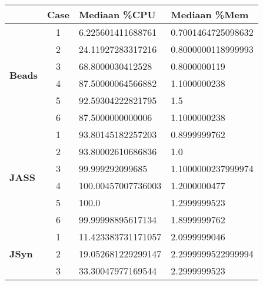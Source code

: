 \begin{table}[]
\centering
\begin{tabular}{l|c|l|l}
                                                    & \textbf{Case} & \textbf{Mediaan \%CPU} & \textbf{Mediaan \%Mem} \\ \hline
\multicolumn{1}{c}{\multirow{6}{*}{\textbf{Beads}}} & 1             & 6.225601411688761      & 0.7001464725098632     \\
\multicolumn{1}{c}{}                                & 2             & 24.11927283317216      & 0.8000000118999993     \\
\multicolumn{1}{c}{}                                & 3             & 68.8000030412528       & 0.8000000119           \\
\multicolumn{1}{c}{}                                & 4             & 87.50000064566882      & 1.1000000238           \\
\multicolumn{1}{c}{}                                & 5             & 92.59304222821795      & 1.5                    \\
\multicolumn{1}{c}{}                                & 6             & 87.5000000000006       & 1.1000000238           \\ \hline
\multirow{6}{*}{\textbf{JASS}}                      & 1             & 93.80145182257203      & 0.8999999762           \\
                                                    & 2             & 93.80002610686836      & 1.0                    \\
                                                    & 3             & 99.999292099685        & 1.1000000237999974     \\
                                                    & 4             & 100.00457007736003     & 1.2000000477           \\
                                                    & 5             & 100.0                  & 1.2999999523           \\
                                                    & 6             & 99.99998895617134      & 1.8999999762           \\ \hline
\multirow{6}{*}{\textbf{JSyn}}                      & 1             & 11.423383731171057     & 2.0999999046           \\
                                                    & 2             & 19.052681229299147     & 2.2999999522999994     \\
                                                    & 3             & 33.30047977169544      & 2.2999999523           \\

\end{tabular}
\end{table}
